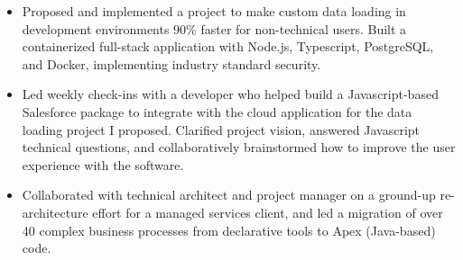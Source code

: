 \documentclass[10pt,a4paper,ragged2e]{altacv}
\begin{document}

\begin{fullwidth}
\makecvheader
\end{fullwidth}




\begin{itemize}
    
\item Proposed and implemented a project to make custom data loading in development environments 90\% faster for non-technical users. Built a containerized full-stack application with Node.js, Typescript, PostgreSQL, and Docker, implementing industry standard security.

\item Led weekly check-ins with a developer who helped build a Javascript-based Salesforce package to integrate with the cloud application for the data loading project I proposed. Clarified project vision, answered Javascript technical questions, and collaboratively brainstormed how to improve the user experience with the software.

\item Collaborated with technical architect and project manager on a ground-up re-architecture effort for a managed services client, and led a migration of over 40 complex business processes from declarative tools to Apex (Java-based) code.

\end{itemize}
\end{document}
